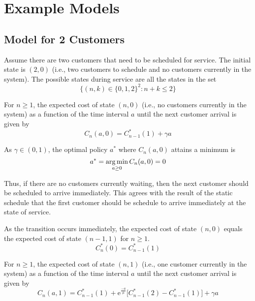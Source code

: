 \section{Example Models}
\subsection{Model for 2 Customers}
Assume there are two customers that need to be scheduled for service. The initial state is $(2, 0)$ (i.e., two customers to schedule and no customers currently in the system). The possible states during service are all the states in the set
\begin{equation}
	\Big\{ (n, k) \in \{ 0, 1, 2 \}^{2} : n + k \leq 2 \Big\}
\end{equation}

For $n \geq 1$, the expected cost of state $(n, 0)$ (i.e., no customers currently in the system) as a function of the time interval $a$ until the next customer arrival is given by
\begin{equation}
	C_{n} (a, 0) = C_{n - 1}^{*} (1) + \gamma a 	
\end{equation}

As $\gamma \in (0, 1)$, the optimal policy $a^{*}$ where $C_{n} (a, 0)$ attains a minimum is
\begin{equation}
	a^{*} = \operatorname*{arg\,min}_{a \geq 0} C_{n} (a, 0) = 0
	\label{eqn:Dynamic_No_Waiting}
\end{equation}

Thus, if there are no customers currently waiting, then the next customer should be scheduled to arrive immediately. This agrees with the result of the static schedule that the first customer should be schedule to arrive immediately at the state of service.

As the transition occurs immediately, the expected cost of state $(n, 0)$ equals the expected cost of state $(n - 1, 1)$ for $n \geq 1$.
\begin{equation}
	C_{n}^{*} (0) = C_{n - 1}^{*} (1)
\end{equation}

For $n \geq 1$, the expected cost of state $(n, 1)$ (i.e., one customer currently in the system) as a function of the time interval $a$ until the next customer arrival is given by
\begin{equation}
	C_{n} (a, 1) = C_{n - 1}^{*} (1) + \mathrm{e}^{\frac{-a}{\mu}} \Big[ C_{n - 1}^{*} (2) - C_{n - 1}^{*} (1) \Big] + \gamma a
\end{equation}

